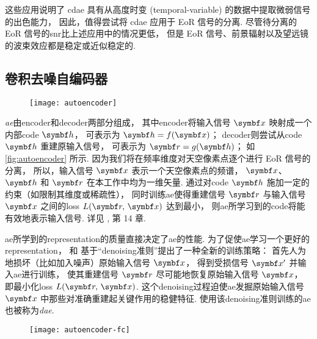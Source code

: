 这些应用说明了 \ac{cdae} 具有从高度时变 (temporal-variable)
的数据中提取微弱信号的出色能力，
因此，值得尝试将 \ac{cdae} 应用于 EoR 信号的分离.
尽管待分离的 EoR 信号的\ac{snr}比上述应用中的情况更低，
但是 EoR 信号、前景辐射以及望远镜的波束效应都是稳定或近似稳定的.

\subsection{卷积去噪自编码器}
\label{sec:cdae}

\begin{figure}[htp]
  \centering
  \texttt{[image: autoencoder]}
  \label{fig:autoencoder}
\end{figure}

\emph{\ac{ae}}由\ac{encoder}和\ac{decoder}两部分组成，
其中\ac{encoder}将输入信号 $\B{x}$ 映射成一个内部\ac{code} $\B{h}$，
可表示为 $\B{h} = f(\B{x})$；
\ac{decoder}则尝试从\ac{code} $\B{h}$ 重建原输入信号，
可表示为 $\B{r} = g(\B{h})$；
如\autoref{fig:autoencoder} 所示.
因为我们将在频率维度对天空像素点逐个进行 EoR 信号的分离，
所以，输入信号 $\B{x}$ 表示一个天空像素点的频谱，
$\B{x}$、$\B{h}$ 和 $\B{r}$ 在本工作中均为一维矢量.
通过对\ac{code} $\B{h}$ 施加一定的约束（如限制其维度或稀疏性），
同时训练\ac{ae}使得重建信号 $\B{r}$ 与输入信号 $\B{x}$
之间的\ac{loss} $L(\B{r}, \,\B{x})$ 达到最小，
则\ac{ae}所学习到的\ac{code}将能有效地表示输入信号.
详见 , 第 14 章.

\ac{ae}所学到的\ac{representation}的质量直接决定了\ac{ae}的性能.
为了促使\ac{ae}学习一个更好的\ac{representation}，
 和 
基于\enquote{\ac{denoising}准则}提出了一种全新的训练策略：
首先人为地损坏（比如加入噪声）原始输入信号 $\B{x}$，
得到受损信号 $\B{x}'$ 并输入\ac{ae}进行训练，
使其重建信号 $\B{r}$ 尽可能地恢复原始输入信号 $\B{x}$，
即最小化\ac{loss} $L(\B{r}, \,\B{x})$.
这个\ac{denoising}过程迫使\ac{ae}发掘原始输入信号 $\B{x}$
中那些对准确重建起关键作用的稳健特征.
使用该\ac{denoising}准则训练的\ac{ae}也被称为\emph{\ac{dae}}.

\begin{figure}[htp]
  \centering
  \texttt{[image: autoencoder-fc]}
  \label{fig:autoencoder-fc}
\end{figure}

